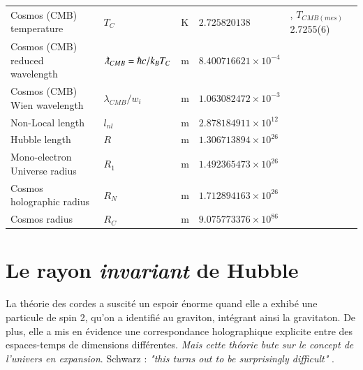 \documentclass[a4paper,9pt]{article}
\begin{document}
\begin{table}
\begin{tabular}{lllll}
   Cosmos (CMB) temperature & $T_{C}$ & K & $2.725820138$ & \cite{Sanchez2}, $T_{CMB(mes)} $ 2.7255(6)  \\
   Cosmos (CMB) reduced wavelength & $\lambdabar_{CMB} = \hbar c/ k_B T_C $ & m & $8.400716621 \times 10^{-4} $ & \cite{Sanchez2} \\
   Cosmos (CMB) Wien wavelength & $\lambda_{CMB}/w_i $ & m & $1.063082472  \times 10^{-3} $ & \cite{Sanchez2} \\
   
   Non-Local length & $l_{nl}$ & m & $2.878184911 \times 10^{12} $ & \cite{Sanchez2} \\ 
   
    Hubble length & $R$ & m & $1.306713894 \times 10^{26} $ & \cite{Sanchez2} \\ 
   
   
   
   Mono-electron Universe radius & $R_1$ & m & $1.492365473 \times 10^{26} $ & \cite{Sanchez2} \\ 
   Cosmos holographic radius & $R_N$ & m & $1.712894163 \times 10^{26} $ & \cite{Sanchez2} \\  
   Cosmos radius & $R_C$ & m & $9.075773376 \times 10^{86} $ & \cite{Sanchez2} \\ 
   

    \bottomrule
  \end{tabular}
\end{table}


\section{Le rayon \textit{invariant} de Hubble}


La théorie des cordes a suscité un espoir énorme quand elle a exhibé une particule de spin 2, qu'on a identifié au graviton, intégrant ainsi la gravitaton. De plus, elle a mis en évidence une correspondance holographique explicite entre des espaces-temps de dimensions différentes. \textit{Mais cette théorie bute sur le concept de l'univers en expansion}. Schwarz : \textit {"this turns out to be surprisingly difficult"} \cite{Schwarz}.  
\end{document}
